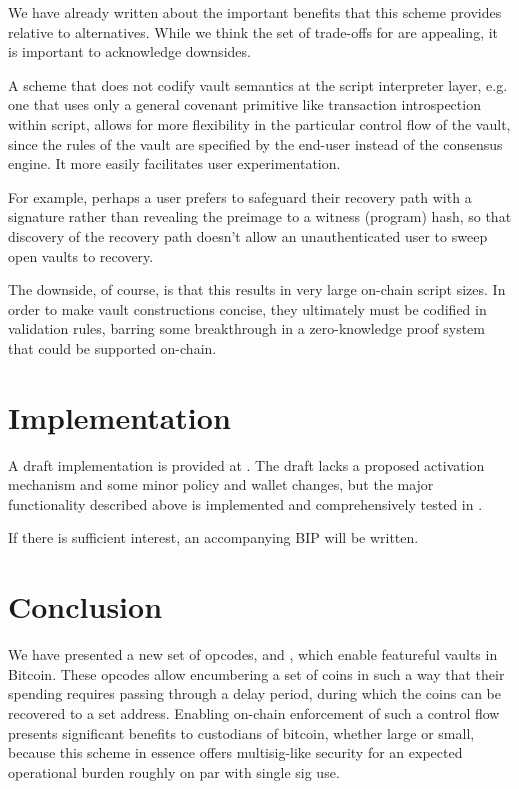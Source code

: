 \documentclass[10pt]{article}
\begin{document}
We have already written about the important benefits that this scheme provides relative
to alternatives. While we think the set of trade-offs for \opv{} are
appealing, it is important to acknowledge downsides.

A scheme that does not codify vault semantics at the script interpreter layer, e.g. one
that uses only a general covenant primitive like transaction introspection within
script, allows for more flexibility in the particular control flow of the vault, since
the rules of the vault are specified by the end-user instead of the consensus engine.
It more easily facilitates user experimentation.

For example, perhaps a user prefers to safeguard their recovery path with a signature
rather than revealing the preimage to a witness (program) hash, so that discovery of
the recovery path doesn't allow an unauthenticated user to sweep open vaults to
recovery.

The downside, of course, is that this results in very large on-chain script sizes. In
order to make vault constructions concise, they ultimately must be codified in
validation rules, barring some breakthrough in a zero-knowledge proof system that could
be supported on-chain.

\section*{Implementation}

A draft implementation is provided at \cite{Impl}. The draft lacks a proposed
activation mechanism and some minor policy and wallet changes, but the major
functionality described above is implemented and comprehensively tested in
\cite{Tests}. 

If there is sufficient interest, an accompanying BIP will be written.

\section*{Conclusion}

We have presented a new set of opcodes, \opv{} and \opuv{}, which enable featureful
vaults in Bitcoin. These opcodes allow encumbering a set of coins in such a way that
their spending requires passing through a delay period, during which the coins can be
recovered to a set address. Enabling on-chain enforcement of such a control flow
presents significant benefits to custodians of bitcoin, whether large or small, because
this scheme in essence offers multisig-like security for an expected operational burden roughly
on par with single sig use.
\end{document}
